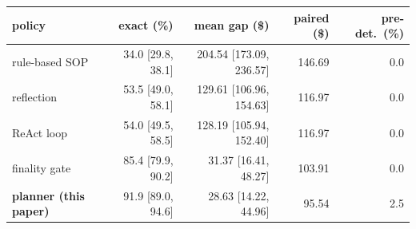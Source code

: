 \begin{tabular}{lrrrr}
\toprule
policy & exact (\%) & mean gap (\$) & paired (\$) & pre-det.\ (\%) \\
\midrule
rule-based SOP & 34.0 [29.8, 38.1] & 204.54 [173.09, 236.57] & 146.69 & 0.0 \\
reflection & 53.5 [49.0, 58.1] & 129.61 [106.96, 154.63] & 116.97 & 0.0 \\
ReAct loop & 54.0 [49.5, 58.5] & 128.19 [105.94, 152.40] & 116.97 & 0.0 \\
finality gate & 85.4 [79.9, 90.2] & 31.37 [16.41, 48.27] & 103.91 & 0.0 \\
\bfseries planner (this paper) & 91.9 [89.0, 94.6] & 28.63 [14.22, 44.96] & 95.54 & 2.5 \\
\bottomrule
\end{tabular}